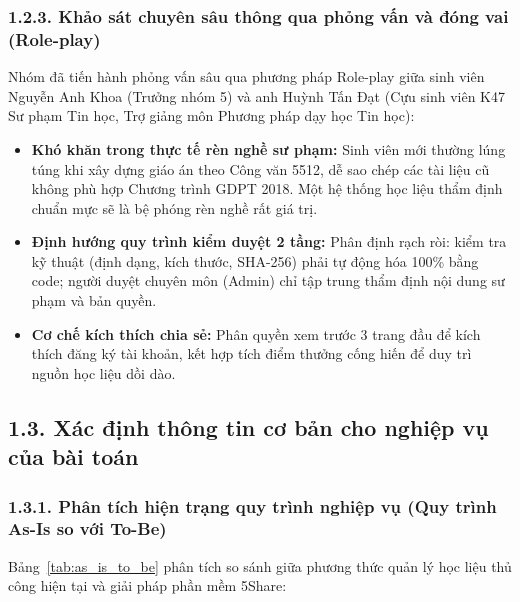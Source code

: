 \subsubsection{1.2.3. Khảo sát chuyên sâu thông qua phỏng vấn và đóng vai (Role-play)}
Nhóm đã tiến hành phỏng vấn sâu qua phương pháp Role-play giữa sinh viên Nguyễn Anh Khoa (Trưởng nhóm 5) và anh Huỳnh Tấn Đạt (Cựu sinh viên K47 Sư phạm Tin học, Trợ giảng môn Phương pháp dạy học Tin học):
\begin{itemize}
    \item \textbf{Khó khăn trong thực tế rèn nghề sư phạm:} Sinh viên mới thường lúng túng khi xây dựng giáo án theo Công văn 5512, dễ sao chép các tài liệu cũ không phù hợp Chương trình GDPT 2018. Một hệ thống học liệu thẩm định chuẩn mực sẽ là bệ phóng rèn nghề rất giá trị.
    \item \textbf{Định hướng quy trình kiểm duyệt 2 tầng:} Phân định rạch ròi: kiểm tra kỹ thuật (định dạng, kích thước, SHA-256) phải tự động hóa 100\% bằng code; người duyệt chuyên môn (Admin) chỉ tập trung thẩm định nội dung sư phạm và bản quyền.
    \item \textbf{Cơ chế kích thích chia sẻ:} Phân quyền xem trước 3 trang đầu để kích thích đăng ký tài khoản, kết hợp tích điểm thưởng cống hiến để duy trì nguồn học liệu dồi dào.
\end{itemize}

\subsection{1.3. Xác định thông tin cơ bản cho nghiệp vụ của bài toán}

\subsubsection{1.3.1. Phân tích hiện trạng quy trình nghiệp vụ (Quy trình As-Is so với To-Be)}
Bảng~\ref{tab:as_is_to_be} phân tích so sánh giữa phương thức quản lý học liệu thủ công hiện tại và giải pháp phần mềm 5Share:

